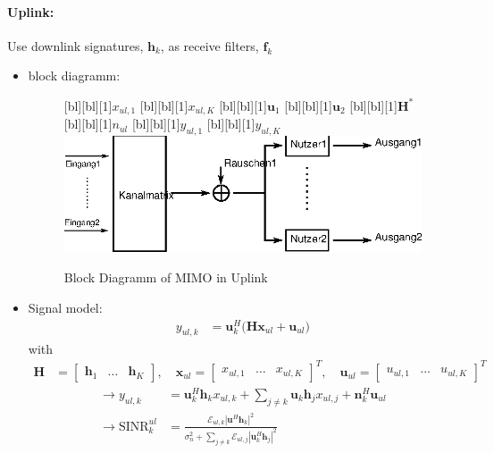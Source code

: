 \documentclass[a4paper, 10pt]{article}
\begin{document}
\paragraph{Uplink:} 
Use downlink signatures, $\mathbf{h}_k$, as receive filters, $\mathbf{f}_k$
\begin{itemize}
	\item block diagramm: 
	\begin{figure}[ht]
		\centering	
		[bl][bl][1]{$x_{ul,1} $}
		[bl][bl][1]{$x_{ul,K} $}
		[bl][bl][1]{$\mathbf{u}_1 $}
		[bl][bl][1]{$\mathbf{u}_2 $}
		[bl][bl][1]{$\mathbf{H}^* $}
		[bl][bl][1]{$n_{ul} $}
		[bl][bl][1]{$y_{ul,1} $}
		[bl][bl][1]{$y_{ul,K} $}
		\includegraphics[scale=0.8]{Uplink_MIMO}	
		\caption{Block Diagramm of MIMO in Uplink}
		\label{fig:Uplink_MIMO}	
	\end{figure}
	\item Signal model:
	\begin{align*}
		y_{ul,k} &= \mathbf{u}_k^H\bigl(\mathbf{Hx}_{ul} + \mathbf{u}_{ul}\bigr) 
	\end{align*}	
		with 
	\begin{align*}
		\mathbf{H} &= 
		\begin{bmatrix}
			\mathbf{h}_1 & \ldots & \mathbf{h}_K
		\end{bmatrix} ,\quad \mathbf{x}_{ul} = 
		\begin{bmatrix}
			x_{ul,1} & \ldots & x_{ul,K}
		\end{bmatrix}^T , \quad \mathbf{u}_{ul} = 
		\begin{bmatrix}
			u_{ul,1} & \ldots & u_{ul,K}
		\end{bmatrix}^T 
	\end{align*}		
	\begin{align}
		\rightarrow y_{ul,k} &= \mathbf{u}_k^H\mathbf{h}_kx_{ul,k} + \sum\limits_{j \neq k}\mathbf{u}_k\mathbf{h}_jx_{ul,j} + \mathbf{n}_k^H\mathbf{u}_{ul}\\
		\rightarrow \text{SINR}_k^{ul} &= \frac{\mathcal{E}_{ul,k}|\mathbf{u}^H\mathbf{h}_k|^2}{\sigma_n^2 + \sum\limits_{j\neq k}\mathcal{E}_{ul,j}|\mathbf{u}_k^H\mathbf{h}_j|^2}\label{eq:Formel_8}

\end{align}
\end{itemize}
\end{document}
